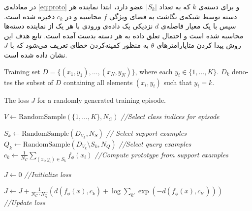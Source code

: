 	در معادله‌ی 
\ref{eq:proto}
و برای دسته‌ی 
$k$
که به تعداد 
$|S_k|$
عضو دارد، 
ابتدا نماینده هر دسته توسط شبکه‌ی نگاشت به فضای ویژگی 
$f$
محاسبه و در 
$c_k$
ذخیره شده است. سپس با یک معیار فاصله‌ی 
$d$
نزدیکی یک داده‌ی ورودی با هر یک از نماینده دسته‌ها محاسبه شده است و احتمال تعلق داده به هر دسته بدست آمده است.
تابع هدف این روش پیدا کردن متاپارامترهای 
$\theta$
به منظور کمینه‌کردن خطای
تعریف می‌شود که با 
$J$
نشان داده شده است.

\begin{latin}
	\begin{algorithm}
		\caption{Training episode loss computation for prototypical networks. N is the number of
			examples in the training set, K is the number of classes in the training set, $N_C \le K$ is the number
			of classes per episode, $N_S$ is the number of support examples per class, $N_Q$ is the number of query
			examples per class. $(S, N)$ denotes a set of N elements chosen uniformly at
			random from set S, without replacement
			\cite{protonet}
			.}
		\label{alg:protonet}
		\begin{algorithmic}[1]
			\renewcommand{\algorithmicrequire}{\textbf{Input:}}
			\renewcommand{\algorithmicensure}{\textbf{Output:}}
			\renewcommand{\algorithmiccomment}[1]{\hfill \textit{//#1}}
			\REQUIRE Training set $D = \{(x_1, y_1), \ldots, (x_N, y_N)\}$, where each $y_i \in \{1, \ldots, K\}$. $D_k$ denotes the subset of $D$ containing all elements $(x_i, y_i)$ such that $y_i = k$.
			
			\ENSURE The loss $J$ for a randomly generated training episode.
			
			\STATE $V \leftarrow \text{RandomSample}(\{1, \ldots, K\}, N_C)$
			\hfill \textit{//Select class indices for episode}
			
			\STATE $S_k \leftarrow \text{RandomSample}(D_{V_k}, N_S)$
			\hfill \textit{// Select support examples}
			\STATE $Q_k \leftarrow \text{RandomSample}(D_{V_k} \setminus S_k, N_Q)$
			\hfill \textit{//Select query examples}
			\STATE $c_k \leftarrow \frac{1}{N_C} \sum_{(x_i, y_i) \in S_k} f_{\phi}(x_i)$
			\hfill \textit{//Compute prototype from support examples}
			\ENDFOR
			
			\STATE $J \leftarrow 0$
			\hfill \textit{//Initialize loss}
			
			\STATE $J \leftarrow J + \frac{1}{N_C \cdot N_Q} \left( d(f_{\phi}(x), c_k) + \log \sum_{k'} \exp(-d(f_{\phi}(x), c_{k'})) \right)$
			\hfill \textit{//Update loss}
			\ENDFOR
			\ENDFOR
		\end{algorithmic}
	\end{algorithm}
\end{latin}


